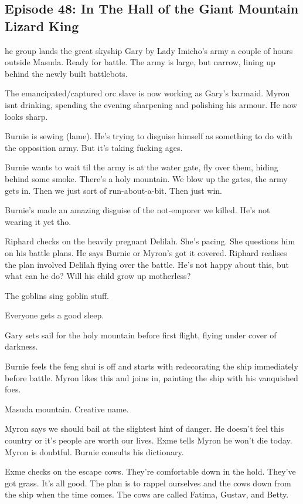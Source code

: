 \subsection{Episode 48: In The Hall of the Giant Mountain Lizard King}

he group lands the great skyship Gary by Lady Imicho's army a couple of hours outside Masuda. Ready for battle. The army is large, but narrow, lining up behind the newly built battlebots.\medskip

The emancipated/captured orc slave is now working as Gary's barmaid. Myron isnt drinking, spending the evening sharpening and polishing his armour. He now looks sharp.\medskip

Burnie is sewing (lame). He's trying to disguise himself as something to do with the opposition army. But it's taking fucking ages.\medskip

Burnie wants to wait til the army is at the water gate, fly over them, hiding behind some smoke. There's a holy mountain. We blow up the gates, the army gets in. Then we just sort of run-about-a-bit. Then just win.\medskip

Burnie's made an amazing disguise of the not-emporer we killed. He's not wearing it yet tho.\medskip

Riphard checks on the heavily pregnant Delilah. She's pacing. She questions him on his battle plans. He says Burnie or Myron's got it covered. Riphard realises the plan involved Delilah flying over the battle. He's not happy about this, but what can he do? Will his child grow up motherless?\medskip

The goblins sing goblin stuff.\medskip

Everyone gets a good sleep.\medskip

Gary sets sail for the holy mountain before first flight, flying under cover of darkness.\medskip

Burnie feels the feng shui is off and starts with redecorating the ship immediately before battle. Myron likes this and joins in, painting the ship with his vanquished foes.\medskip

Masuda mountain. Creative name.\medskip

Myron says we should bail at the slightest hint of danger. He doesn't feel this country or it's people are worth our lives. Exme tells Myron he won't die today. Myron is doubtful. Burnie consults his dictionary.\medskip

Exme checks on the escape cows. They're comfortable down in the hold. They've got grass. It's all good. The plan is to rappel ourselves and the cows down from the ship when the time comes. The cows are called Fatima, Gustav, and Betty.\medskip

